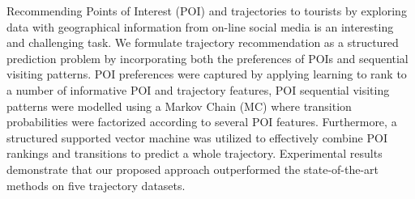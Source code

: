 Recommending Points of Interest (POI) and trajectories to tourists by exploring data with 
geographical information from on-line social media is an interesting and challenging task.
We formulate trajectory recommendation as a structured prediction problem by incorporating 
both the preferences of POIs and sequential visiting patterns.
POI preferences were captured by applying learning to rank to a number of informative POI and trajectory features,
POI sequential visiting patterns were modelled using a Markov Chain (MC) where transition 
probabilities were factorized according to several POI features.
Furthermore, a structured supported vector machine was utilized to effectively combine POI rankings
and transitions to predict a whole trajectory.
Experimental results demonstrate that our proposed approach outperformed
the state-of-the-art methods on five trajectory datasets.
